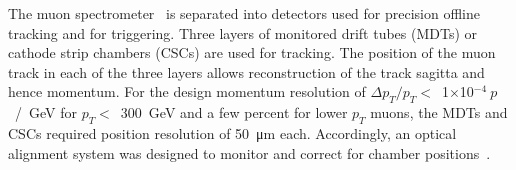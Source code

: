 The muon spectrometer~\cite{atlas_muon_spectrometer_tdr} is separated into detectors used for precision offline tracking and for triggering. Three layers of monitored drift tubes (MDTs) or cathode strip chambers (CSCs) are used for tracking. The position of the muon track in each of the three layers allows reconstruction of the track sagitta and hence momentum. For the design momentum resolution of $\Delta p_T / p_T <$~1$\times$10$^{-4}~p$~/~GeV for $p_T <$~300~GeV and a few percent for lower $p_T$ muons, the MDTs and CSCs required position resolution of \SI{50}{\micro\meter} each. Accordingly, an optical alignment system was designed to monitor and correct for chamber positions~\cite{atlas_muon_spectrometer_tdr, aefsky_optical_2008}. 


